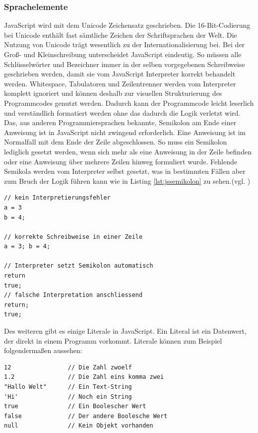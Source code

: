 \subsubsection{Sprachelemente} JavaScript wird mit dem Unicode Zeichensatz geschrieben. Die 16-Bit-Codierung bei Unicode enthält fast sämtliche Zeichen der Schriftsprachen der Welt. Die Nutzung von Unicode trägt wesentlich zu der Internationalisierung bei. Bei der Groß- und Kleinschreibung unterscheidet JavaScript eindeutig. So müssen alle Schlüsselwörter und Bezeichner immer in der selben vorgegebenen Schreibweise geschrieben werden, damit sie vom JavaScript Interpreter korrekt behandelt werden. Whitespace, Tabulatoren und Zeilentrenner werden vom Interpreter komplett ignoriert und können deshalb zur visuellen Strukturierung des Programmcodes genutzt werden. Dadurch kann der Programmcode leicht leserlich und verständlich formatiert werden ohne das dadurch die Logik verletzt wird. Das, aus anderen Programmiersprachen bekannte, Semikolon am Ende einer Anweisung ist in JavaScript nicht zwingend erforderlich. Eine Anweisung ist im Normalfall mit dem Ende der Zeile abgeschlossen. So muss ein Semikolon lediglich gesetzt werden, wenn sich mehr als eine Anweisung in der Zeile befinden oder eine Anweisung über mehrere Zeilen hinweg formuliert wurde. Fehlende Semikola werden vom Interpreter selbst gesetzt, was in bestimmten Fällen aber zum Bruch der Logik führen kann wie in Listing \ref{lst:jssemikolon} zu sehen.(vgl. \cite[S.15ff]{FlanJava2007})

	\vspace{1em}
	\begin{lstlisting}[frame=htrbl, caption=JavaScript Logikbruch Semikolon, label=lst:jssemikolon]
// kein Interpretierungsfehler
a = 3
b = 4;

// korrekte Schreibweise in einer Zeile
a = 3; b = 4;

// Interpreter setzt Semikolon automatisch
return
true;
// falsche Interpretation anschliessend
return;
true;
	\end{lstlisting}

Des weiteren gibt es einige Literale in JavaScript. \glqq Ein Literal ist ein Datenwert, der direkt in einem Programm vorkommt. Literale können zum Beispiel folgendermaßen aussehen:\grqq{}\cite[S.18]{FlanJava2007}

	\vspace{1em}
	\begin{lstlisting}[frame=htrbl, caption=JavaScript Literale, label=lst:jsliterale]
12                // Die Zahl zwoelf
1.2               // Die Zahl eins komma zwei
"Hallo Welt"      // Ein Text-String
'Hi'              // Noch ein String
true              // Ein Boolescher Wert
false             // Der andere Boolesche Wert
null              // Kein Objekt vorhanden
	\end{lstlisting}
	

